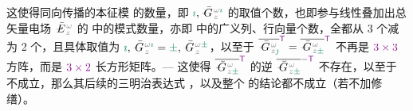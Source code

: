 这使得同向传播的\textcolor{PineGreen}{本征模}  的数量，即 $\textcolor{PineGreen}{\imath}, \xint{\mathcolor{gray}{-}}{16}{\bar{G}}^{\;\!\mathcolor{gray}{\omega} \textcolor{PineGreen}{\imath}}_{\;\! \mathcolor{gray}{z}}$ 的取值个数，也即参与\textcolor{PineGreen}{线性叠加}出\textcolor{PineGreen}{总矢量电场} $\xint{\mathcolor{gray}{-}}{25}{\bar{E}}^{\;\!\mathcolor{gray}{\omega}}_{\;\! \mathcolor{gray}{z}}$ 的 中的\textcolor{PineGreen}{模式}数量，亦即  中的广义列、行向量个数，全都从 3 个减为 2 个，且具体取值为 $\textcolor{PineGreen}{\imath}, \xint{\mathcolor{gray}{-}}{16}{\bar{G}}^{\;\!\mathcolor{gray}{\omega} \textcolor{PineGreen}{\imath}}_{\;\! \mathcolor{gray}{z}} = \textcolor{PineGreen}{\pm}, \xint{\mathcolor{gray}{-}}{16}{\bar{G}}^{\;\!\mathcolor{gray}{\omega} \textcolor{PineGreen}{\pm}}_{\;\! \mathcolor{gray}{z}}$，以至于 $\overline{\xint{\mathcolor{gray}{-}}{16}{\bar{G}}^{\;\!\mathcolor{gray}{\omega}}_{\;\! \mathcolor{gray}{z} \textcolor{PineGreen}{\jmath}}}^{\mathsf{\textcolor{Plum}{T}}} = \overline{\xint{\mathcolor{gray}{-}}{16}{\bar{G}}^{\;\!\mathcolor{gray}{\omega}}_{\;\! \mathcolor{gray}{z} \textcolor{PineGreen}{\pm}}}^{\mathsf{\textcolor{Plum}{T}}}$ 不再是 $\textcolor{Plum}{3 \times 3}$ 方阵，而是 $\textcolor{Plum}{3 \times 2}$ 长方形矩阵。--- 这使得 $\overline{\xint{\mathcolor{gray}{-}}{16}{\bar{G}}^{\;\!\mathcolor{gray}{\omega}}_{\;\! \mathcolor{gray}{z} \textcolor{PineGreen}{\pm}}}^{\mathsf{\textcolor{Plum}{T}}}$ 的逆 $\overline{\xint{\mathcolor{gray}{-}}{16}{\bar{G}}^{\;\!\mathcolor{gray}{\omega}}_{\;\! \mathcolor{gray}{z} \textcolor{PineGreen}{\pm}}}^{\textcolor{Plum}{-\mathsf{T}}}$ 不存在，以至于  不成立，那么其后续的三明治表达式 ，以及整个  的结论都不成立（若不加修缮）。

